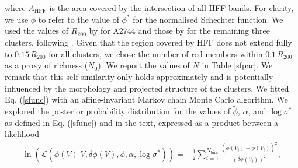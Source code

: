\documentclass{aa}
\begin{document}
where $A_\mathrm{HFF}$ is the area covered by the intersection of all HFF bands. For clarity, we use $\tilde{\phi}$ to refer to the value of $\phi^*$ for the normalised Schechter function. We used the values of $R_{200}$ by \citet{medezinski16} for A2744 and those by \citet{umetsu18} for the remaining three clusters, following \citet{angora20}. Given that the region covered by HFF does not extend fully to $0.15 \, R_{200}$ for all clusters, we chose the number of red members within $0.1 \, R_{200}$ as a proxy of richness ($N_0$). We report the values of $\tilde{N}$ in Table \ref{sfpar}. We remark that this self-similarity only holds approximately and is potentially influenced by the morphology and projected structure of the clusters. We fitted Eq. (\ref{sfunc}) with an affine-invariant Markov chain Monte Carlo \citep[MCMC;][]{goodman10,foreman13} algorithm. We explored the posterior probability distribution for the values of $\tilde{\phi}$, $\alpha$, and $\log\sigma^*$ as defined in Eq. (\ref{sfunc}) and in the text, expressed as a product between a likelihood
\begin{multline}\label{lik}
    \ln \left( \mathcal{L}(\phi(V)| V,\delta\phi(V),\tilde{\phi},\alpha,\log\sigma^*) \right) = - \frac{1}{2} \sum_{i=1}^{N_\mathrm{bins}}  \frac{\left(\phi(V_i)-\hat{\phi}(V_i)\right)^2}{\left(\delta\phi(V_i)\right)^2} ,
\end{multline}
\end{document}

